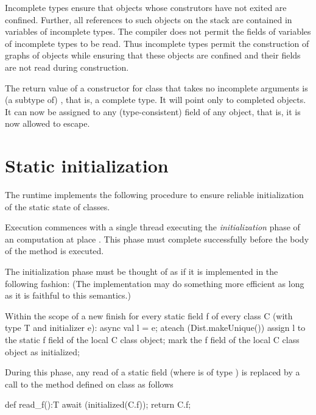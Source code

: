 Incomplete types ensure that objects whose construtors have not exited
are confined. Further, all references to such objects on the stack
are contained in variables of incomplete types. The compiler does not
permit the fields of variables of incomplete types to be read. 
Thus incomplete types permit the construction of graphs of objects
while ensuring that these objects are confined and their fields are not
read during construction. 

The return value of a constructor for class  that takes no
incomplete arguments is (a subtype of) , that is, a complete
type. It will point only to completed objects. It can now be
assigned to any (type-consistent) field of any object, that is, it is
now allowed to escape.





\section{Static initialization}
\label{StaticInitialization}
The \Xten{} runtime implements the following procedure to ensure
reliable initialization of the static state of classes.


Execution commences with a single thread executing the
\emph{initialization} phase of an \Xten{} computation at place . This
phase must complete successfully before the body of the  method is
executed.

The initialization phase must be thought of as if it is implemented in
the following fashion: (The implementation may do something more
efficient as long as it is faithful to this semantics.)

\begin{xten}
Within the scope of a new finish
for every static field f of every class C 
   (with type T and initializer e):
async {
  val l = e; 
  ateach (Dist.makeUnique()) {
     assign l to the static f field of 
         the local C class object;
     mark the f field of the local C 
         class object as initialized;
  }
}
\end{xten}

During this phase, any read of a static field  (where  is of type )
is replaced by a call to the method  defined on class 
as follows

\begin{xten}
def read_f():T {
   await (initialized(C.f));
   return C.f;
}
\end{xten}
 


